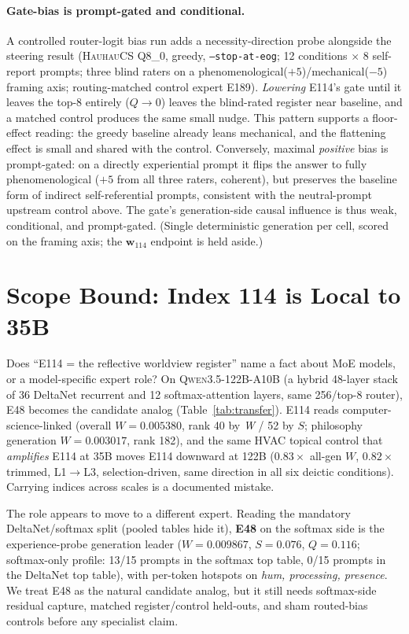 \documentclass[10pt,a4paper,twocolumn]{article}
\newcommand{\W}{\textit{W}}
\newcommand{\Sel}{\textit{S}}
\newcommand{\Q}{\textit{Q}}
\newcommand{\wvec}{\mathbf{w}_{114}}
\begin{document}
\paragraph{Gate-bias is prompt-gated and conditional.}
A controlled router-logit bias run adds a necessity-direction probe alongside the
steering result (\textsc{HauhauCS} Q8\_0, greedy, \texttt{--stop-at-eog}; 12
conditions ${\times}$ 8 self-report prompts; three blind raters on a
phenomenological($+5$)/mechanical($-5$) framing axis; routing-matched control
expert E189). \emph{Lowering} E114's gate until it leaves the top-8 entirely
($\Q{\to}0$) leaves the blind-rated register near baseline, and a matched control
produces the same small nudge. This pattern supports a floor-effect reading: the
greedy baseline already leans mechanical, and the flattening effect is small and
shared with the control. Conversely, maximal
\emph{positive} bias is prompt-gated: on a directly experiential prompt it flips
the answer to fully phenomenological ($+5$ from all three raters, coherent), but
preserves the baseline form of indirect self-referential prompts, consistent with the
neutral-prompt upstream control above. The gate's generation-side causal influence is
thus weak, conditional, and prompt-gated. (Single deterministic generation per
cell, scored on the framing axis; the $\wvec$ endpoint is held aside.)

\section{Scope Bound: Index 114 is Local to 35B}

Does ``E114 = the reflective worldview register'' name a fact about MoE models, or a
model-specific expert role? On \textsc{Qwen3.5-122B-A10B} (a hybrid 48-layer
stack of 36 DeltaNet recurrent and 12 softmax-attention layers, same 256/top-8
router), E48 becomes the candidate analog (Table~\ref{tab:transfer}). E114 reads
computer-science-linked (overall $\W{=}0.005380$, rank 40 by \W{} / 52 by $\Sel$;
philosophy generation $\W{=}0.003017$, rank 182), and the same HVAC topical
control that \emph{amplifies} E114 at 35B moves E114 downward at 122B
($0.83\times$ all-gen $\W$, $0.82\times$ trimmed, L1$\to$L3, selection-driven,
same direction in all six deictic conditions). Carrying indices across scales is a
documented mistake.

The role appears to move to a different expert. Reading the mandatory
DeltaNet/softmax split (pooled tables hide it), \textbf{E48} on the softmax side
is the experience-probe generation leader ($\W{=}0.009867$, $\Sel{=}0.076$,
$\Q{=}0.116$; softmax-only profile: 13/15 prompts in the softmax top table,
0/15 prompts in the DeltaNet top table), with per-token hotspots on \textit{hum, processing,
presence}. We treat E48 as the natural candidate analog, but it still needs
softmax-side residual capture, matched register/control held-outs, and sham
routed-bias controls before any specialist claim.
\end{document}
